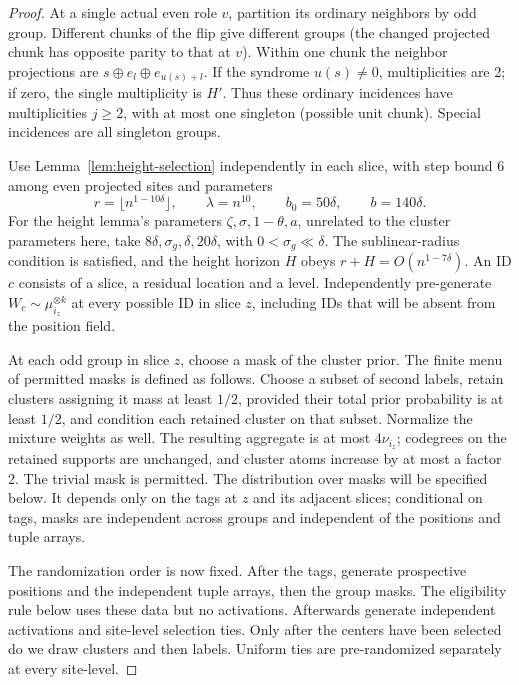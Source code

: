 \begin{proof}
At a single actual even role \(v\), partition its ordinary neighbors by odd group. Different chunks of the flip give different groups (the changed projected chunk has opposite parity to that at \(v\)). Within one chunk the neighbor projections are \(s\oplus e_l\oplus e_{u(s)+l}\). If the syndrome \(u(s)\ne0\), multiplicities are 2; if zero, the single multiplicity is \(H'\). Thus these ordinary incidences have multiplicities \(j\ge2\), with at most one singleton (possible unit chunk). Special incidences are all singleton groups.

Use Lemma~\ref{lem:height-selection} independently in each slice, with step bound 6 among even projected sites and parameters
\[
 r=\lfloor n^{1-10\delta}\rfloor,\qquad
 \lambda=n^{10},\qquad b_0=50\delta,\qquad b=140\delta.
\]
For the height lemma's parameters \(\zeta,\sigma,1-\theta,a\), unrelated to the cluster parameters here, take \(8\delta,\sigma_g,\delta,20\delta\), with \(0<\sigma_g\ll\delta\). The sublinear-radius condition is satisfied, and the height horizon \(H\) obeys \(r+H=O(n^{1-7\delta})\). An ID \(c\) consists of a slice, a residual location and a level. Independently pre-generate \(W_c\sim\mu_{i_z}^{\otimes k}\) at every possible ID in slice \(z\), including IDs that will be absent from the position field.

At each odd group in slice \(z\), choose a mask of the cluster prior. The finite menu of permitted masks is defined as follows. Choose a subset of second labels, retain clusters assigning it mass at least \(1/2\), provided their total prior probability is at least \(1/2\), and condition each retained cluster on that subset. Normalize the mixture weights as well. The resulting aggregate is at most \(4\nu_{i_z}\); codegrees on the retained supports are unchanged, and cluster atoms increase by at most a factor 2. The trivial mask is permitted. The distribution over masks will be specified below. It depends only on the tags at \(z\) and its adjacent slices; conditional on tags, masks are independent across groups and independent of the positions and tuple arrays.

The randomization order is now fixed. After the tags, generate prospective positions and the independent tuple arrays, then the group masks. The eligibility rule below uses these data but no activations. Afterwards generate independent activations and site-level selection ties. Only after the centers have been selected do we draw clusters and then labels. Uniform ties are pre-randomized separately at every site-level.


\end{proof}
